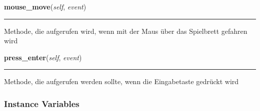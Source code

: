     \label{Main:main:mainGUI:mouse_move}

    \vspace{0.5ex}

\hspace{.8\funcindent}\begin{boxedminipage}{\funcwidth}

    \raggedright \textbf{mouse\_move}(\textit{self}, \textit{event})

    \vspace{-1.5ex}

    \rule{\textwidth}{0.5\fboxrule}
\setlength{\parskip}{2ex}
    Methode, die aufgerufen wird, wenn mit der Maus über das Spielbrett 
    gefahren wird

\setlength{\parskip}{1ex}
    \end{boxedminipage}

    \label{Main:main:mainGUI:press_enter}

    \vspace{0.5ex}

\hspace{.8\funcindent}\begin{boxedminipage}{\funcwidth}

    \raggedright \textbf{press\_enter}(\textit{self}, \textit{event})

    \vspace{-1.5ex}

    \rule{\textwidth}{0.5\fboxrule}
\setlength{\parskip}{2ex}
    Methode, die aufgerufen werden sollte, wenn die Eingabetaste gedrückt 
    wird

\setlength{\parskip}{1ex}
    \end{boxedminipage}



  \subsubsection{Instance Variables}

